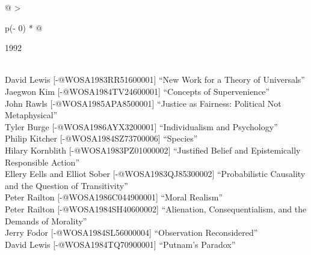 \documentclass[
  10pt,
  letterpaper,
  DIV=11,
  numbers=noendperiod,
  twoside]{scrartcl}
\begin{document}
\begin{longtable}[]{@{}
  >{\raggedright\arraybackslash}p{(\columnwidth - 0\tabcolsep) * }@{}}

\caption{\label{tbl-top-ten-1983}Most cited articles published less than
ten years ago as of 1992.}

\tabularnewline

\toprule\noalign{}
\begin{minipage}[b]{\linewidth}\raggedright
1992
\end{minipage} \\
\midrule\noalign{}
\endhead
\bottomrule\noalign{}
\endlastfoot
David Lewis {[}-@WOSA1983RR51600001{]} ``New Work for a Theory of
Universals'' \\
Jaegwon Kim {[}-@WOSA1984TV24600001{]} ``Concepts of Supervenience'' \\
John Rawls {[}-@WOSA1985APA8500001{]} ``Justice as Fairness: Political
Not Metaphysical'' \\
Tyler Burge {[}-@WOSA1986AYX3200001{]} ``Individualism and
Psychology'' \\
Philip Kitcher {[}-@WOSA1984SZ73700006{]} ``Species'' \\
Hilary Kornblith {[}-@WOSA1983PZ01000002{]} ``Justified Belief and
Epistemically Responsible Action'' \\
Ellery Eells and Elliot Sober {[}-@WOSA1983QJ85300002{]} ``Probabilistic
Causality and the Question of Transitivity'' \\
Peter Railton {[}-@WOSA1986C044900001{]} ``Moral Realism'' \\
Peter Railton {[}-@WOSA1984SH40600002{]} ``Alienation, Consequentialism,
and the Demands of Morality'' \\
Jerry Fodor {[}-@WOSA1984SL56000004{]} ``Observation Reconsidered'' \\
David Lewis {[}-@WOSA1984TQ70900001{]} ``Putnam's Paradox'' \\

\end{longtable}
\end{document}
